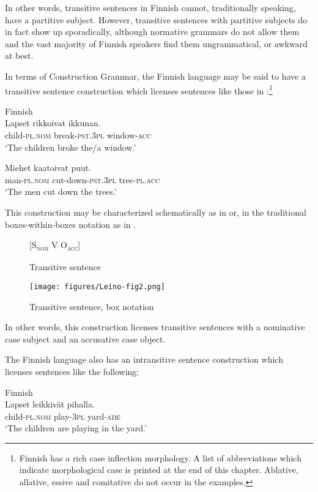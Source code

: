 \documentclass[output=paper, colorlinks,citecolor=brown]{langsci/langscibook}
\begin{document}
In other words, transitive sentences in Finnish cannot, traditionally speaking, have a partitive subject. However, transitive sentences with partitive subjects do in fact show up sporadically, although normative grammars do not allow them and the vast majority of Finnish speakers find them ungrammatical, or awkward at best.

In terms of Construction Grammar, the Finnish language may be said to have a transitive sentence construction which licenses sentences like those in :\footnote{Finnish has a rich case inflection morphology. A list of abbreviations which indicate morphological case is printed at the end of this chapter. Ablative, allative, essive and comitative do not occur in the examples.}


\ea \label{ex:leino_3}
{Finnish}\\
\ea
\gll Lapset              rikkoivat           ikkunan. \label{ex:leino_3a}\\
     child-\textsc{pl.nom}  break-\textsc{pst.3pl}  window-\textsc{acc}\\
\glt `The children broke the/a window.'%

\ex
\gll Miehet            kaatoivat                puut. \label{ex:leino_3b}\\
     man-\textsc{pl.nom}  cut-down-\textsc{pst.3pl}  tree-\textsc{pl.acc}\\
\glt `The men cut down the trees.'
\z \z

This construction may be characterized schematically as in  or, in the traditional boxes-within-boxes notation as in .

\begin{figure}{}
     [S\textsc{\textsubscript{nom}} V O\textsc{\textsubscript{acc}}]
    \caption{Transitive sentence\label{fig:leino_fig1}}
\end{figure}

\begin{figure}
\texttt{[image: figures/Leino-fig2.png]}
\caption{Transitive sentence, box notation\label{fig:leino_fig2}}
\end{figure}

In other words, this construction licenses transitive sentences with a nominative case subject and an accusative case object.

The Finnish language also has an intransitive sentence construction which licenses sentences like the following:

\ea\label{ex:leino_4}
{Finnish}\\
\ea
\label{ex:leino_4a}
\gll Lapset              leikkivät  pihalla.\\
     child-\textsc{pl.nom}  play\textsc{{}-3pl}  yard-\textsc{ade}\\
\glt `The children are playing in the yard.'%
\end{document}

